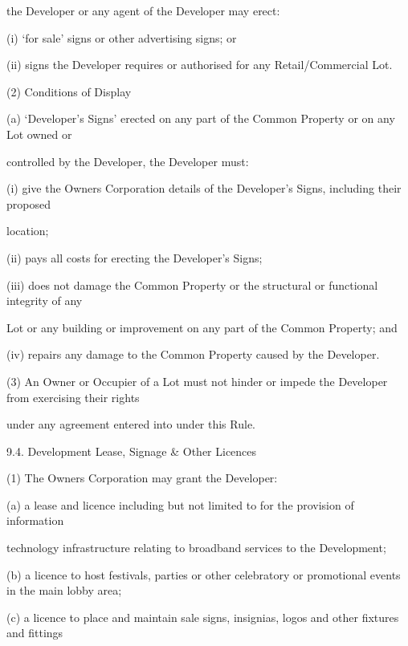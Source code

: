 \documentclass{article}
\begin{document}
{\fontsize{10.02}{1}the Developer or any agent of the Developer may erect: }

{\fontsize{9.962}{1}(i) ‘for sale’ signs or other advertising signs; or }

{\fontsize{9.962}{1}(ii) signs the Developer requires or authorised for any Retail/Commercial Lot. }

{\fontsize{9.962}{1}(2) Conditions of Display }

{\fontsize{9.962}{1}(a) ‘Developer’s Signs’ erected on any part of the Common Property or on any Lot owned or }

{\fontsize{10.02}{1}controlled by the Developer, the Developer must: }

{\fontsize{9.962}{1}(i) give the Owners Corporation details of the Developer’s Signs, including their proposed }

{\fontsize{10.02}{1}location; }

{\fontsize{9.962}{1}(ii) pays all costs for erecting the Developer’s Signs; }

{\fontsize{9.962}{1}(iii) does not damage the Common Property or the structural or functional integrity of any }

{\fontsize{10.02}{1}Lot or any building or improvement on any part of the Common Property; and }

{\fontsize{9.962}{1}(iv) repairs any damage to the Common Property caused by the Developer. }

{\fontsize{9.962}{1}(3) An Owner or Occupier of a Lot must not hinder or impede the Developer from exercising their rights }

{\fontsize{10.02}{1}under any agreement entered into under this Rule. }

{\fontsize{9.99}{1}9.4. Development Lease, Signage \& Other Licences }

{\fontsize{9.962}{1}(1) The Owners Corporation may grant the Developer: }

{\fontsize{9.962}{1}(a) a lease and licence including but not limited to for the provision of information }

{\fontsize{10.02}{1}technology infrastructure relating to broadband services to the Development; }

{\fontsize{9.962}{1}(b) a licence to host festivals, parties or other celebratory or promotional events in the main lobby area; }

{\fontsize{9.962}{1}(c) a licence to place and maintain sale signs, insignias, logos and other fixtures and fittings }
\end{document}
